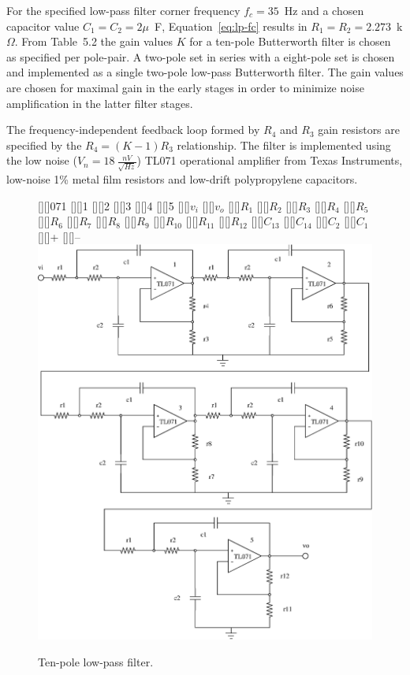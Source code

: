 For the specified low-pass filter corner frequency $f_c = 35$~Hz and a
chosen capacitor value $C_1 = C_2 = 2\mu$~F, Equation~\ref{eq:lp-fc}
results in $R_1 = R_2 = 2.273$~k$\Omega$. From Table~5.2
\cite[p274]{art} the gain values $K$ for a ten-pole Butterworth filter
is chosen as specified per pole-pair. A two-pole set in series with a
eight-pole set is chosen and implemented as a single two-pole low-pass
Butterworth filter. The gain values are chosen for maximal gain in the
early stages in order to minimize noise amplification in the latter
filter stages.

The frequency-independent feedback loop formed by $R_4$ and $R_3$ gain
resistors are specified by the $R_4 = (K - 1)R_3$ relationship. The
filter is implemented using the low noise ($V_n =
18~\frac{nV}{\sqrt{Hz}}$) TL071 operational amplifier from Texas
Instruments, low-noise 1\% metal film resistors and low-drift
polypropylene capacitors.

\begin{figure}[htbp]
	[][]{071} 
	[][]{1} 
	[][]{2} 
	[][]{3} 
	[][]{4} 
	[][]{5} 
	[][]{$v_i$} 
	[][]{$v_o$}
	[][]{$R_1$} 
	[][]{$R_2$}
	[][]{$R_3$} 
	[][]{$R_4$} 
	[][]{$R_5$} 
	[][]{$R_6$} 
	[][]{$R_7$} 
	[][]{$R_8$} 
	[][]{$R_9$} 
	[][]{$R_{10}$} 
	[][]{$R_{11}$} 
	[][]{$R_{12}$} 
	[][]{$C_{13}$}
	[][]{$C_{14}$}
	[][]{$C_2$} 
	[][]{$C_1$} 
	\psfrag{+}[][]{+} 
	\psfrag{-}[][]{--} 
	\includegraphics[width=\textwidth]{lp-imp.eps} 
	\caption{Ten-pole low-pass filter.}  
	\label{fig:lp-imp}
\end{figure}

